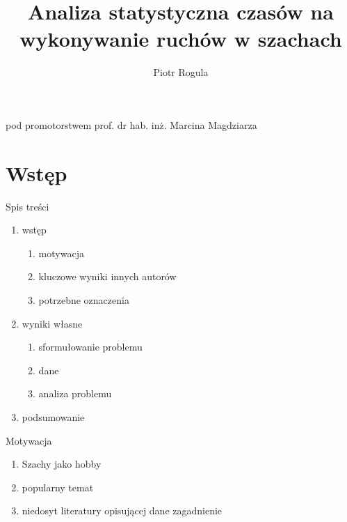 \documentclass{beamer}
\author{Piotr Rogula}
\title{Analiza statystyczna czasów na wykonywanie ruchów w
	szachach}
\institute[Pwr]{Politechnika Wrocławska}
\begin{document}
	
\begin{frame}[plain]
    \maketitle
    \begin{center}
    	pod promotorstwem prof. dr hab. inż. Marcina Magdziarza
    \end{center}
\end{frame}

\section{Wstęp}

\begin{frame}{Spis treści}

\begin{enumerate}
\item wstęp
	\begin{enumerate}
		\item motywacja
		\item kluczowe wyniki innych autorów
		\item potrzebne oznaczenia
	\end{enumerate}
\item wyniki własne
	\begin{enumerate}
		\item sformułowanie problemu
		\item dane
		\item analiza problemu
	\end{enumerate}
\item podsumowanie
\end{enumerate}

\end{frame}

		\begin{frame}{Motywacja}
			\begin{enumerate}
				\item Szachy jako hobby
				\item popularny temat
				\item niedosyt literatury opisującej dane zagadnienie
			\end{enumerate}	
		\end{frame}
\end{document}
